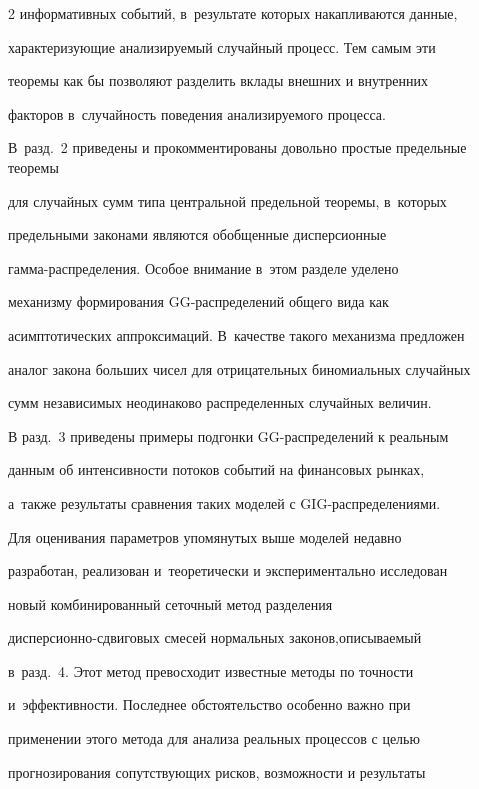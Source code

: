 \begin{multicols}{2}
информативных событий, в~результате которых накапливаются данные,


характеризующие анализируемый случайный процесс. Тем самым эти


теоремы как бы позволяют разделить вклады внешних и внутренних


факторов в~случайность поведения анализируемого процесса. 


В~разд.~2 приведены и прокомментированы довольно простые предельные тео\-ре\-мы


для случайных сумм типа центральной предельной тео\-ре\-мы, в~которых


предельными законами являются обобщенные дисперсионные


гам\-ма-рас\-пре\-де\-ле\-ния. Особое внимание в~этом разделе уделено


механизму формирования GG-рас\-пре\-де\-ле\-ний общего вида как


асимптотических аппроксимаций. В~качестве такого механизма предложен


аналог закона больших чисел для отрицательных биномиальных случайных


сумм независимых неодинаково распределенных случайных величин.





В разд.~3 приведены примеры подгонки GG-рас\-пре\-де\-ле\-ний к реальным


данным об интенсивности потоков событий на финансовых рынках, 


а~также результаты сравнения таких моделей с GIG-рас\-пре\-де\-ле\-ниями.





Для оценивания параметров упомянутых выше моделей недавно


разработан, реализован и~тео\-ре\-ти\-чески и экспериментально исследован


новый комбинированный сеточный метод разделения


дис\-пер\-си\-он\-но-сдви\-го\-вых смесей нормальных законов,\linebreak описываемый 


в~разд.~4. Этот метод превосходит извест\-ные методы по точности 


и~эффективности. Последнее обстоятельство особенно важно при


применении этого метода для анализа реальных процессов с целью


прогнозирования со\-пут\-ст\-ву\-ющих рисков, возможности и результаты



\end{multicols}
